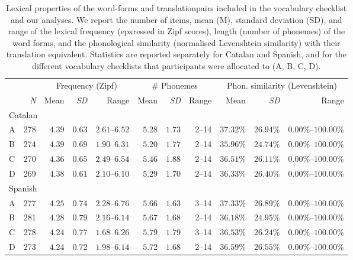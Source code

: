 \documentclass[
  letterpaper,
  DIV=11,
  numbers=noendperiod]{scrartcl}
\begin{document}
\hypertarget{tbl-item-summary}{}
\begin{longtable}{lrrrrrrrrrr}
\caption{\label{tbl-item-summary}Lexical properties of the word-forms and translationpairs included in
the vocabulary checklist and our analyses. We report the number of
items, mean (M), standard deviation (SD), and range of the lexical
frequency (epxressed in Zipf scores), length (number of phonemes) of the
word forms, and the phonological similarity (normalised Levenshtein
similarity) with their translation equivalent. Statistics are reported
separately for Catalan and Spanish, and for the different vocabulary
checklists that participants were allocated to (A, B, C, D). }\tabularnewline

\toprule
 &  & \multicolumn{3}{c}{Frequency (Zipf)} & \multicolumn{3}{c}{\# Phonemes} & \multicolumn{3}{c}{Phon. similarity (Levenshtein)} \\ 
\cmidrule(lr){3-5} \cmidrule(lr){6-8} \cmidrule(lr){9-11}
 & \emph{N} & Mean & \emph{SD} & Range & Mean & \emph{SD} & Range & Mean & \emph{SD} & Range \\ 
\midrule
\multicolumn{11}{l}{Catalan} \\ 
\midrule
A & 278 & $4.39$ & $0.63$ & $2.61$–$6.52$ & $5.28$ & $1.73$ & 2–14 & $37.32\%$ & $26.94\%$ & $0.00\%$–$100.00\%$ \\ 
B & 274 & $4.39$ & $0.69$ & $1.90$–$6.31$ & $5.20$ & $1.77$ & 2–14 & $35.96\%$ & $24.74\%$ & $0.00\%$–$100.00\%$ \\ 
C & 270 & $4.36$ & $0.65$ & $2.49$–$6.54$ & $5.46$ & $1.88$ & 2–14 & $36.51\%$ & $26.11\%$ & $0.00\%$–$100.00\%$ \\ 
D & 269 & $4.38$ & $0.61$ & $2.10$–$6.10$ & $5.29$ & $1.70$ & 2–14 & $36.33\%$ & $26.40\%$ & $0.00\%$–$100.00\%$ \\ 
\midrule
\multicolumn{11}{l}{Spanish} \\ 
\midrule
A & 277 & $4.25$ & $0.74$ & $2.28$–$6.76$ & $5.66$ & $1.63$ & 3–14 & $37.33\%$ & $26.89\%$ & $0.00\%$–$100.00\%$ \\ 
B & 281 & $4.28$ & $0.79$ & $2.16$–$6.14$ & $5.67$ & $1.68$ & 2–14 & $36.18\%$ & $24.95\%$ & $0.00\%$–$100.00\%$ \\ 
C & 278 & $4.24$ & $0.77$ & $1.68$–$6.26$ & $5.79$ & $1.79$ & 3–14 & $36.53\%$ & $26.24\%$ & $0.00\%$–$100.00\%$ \\ 
D & 273 & $4.24$ & $0.72$ & $1.98$–$6.14$ & $5.72$ & $1.68$ & 2–14 & $36.59\%$ & $26.55\%$ & $0.00\%$–$100.00\%$ \\ 
\bottomrule
\end{longtable}
\end{document}
